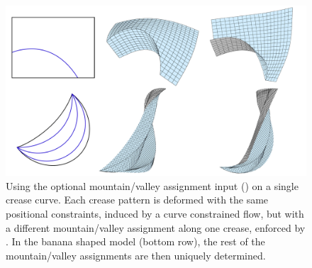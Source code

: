 \begin{figure} [h]
	\centering
	\includegraphics[width=\linewidth]{figures/MV_bias_modeling}
	\caption{Using the optional mountain/valley assignment input () on a single crease curve. Each crease pattern is deformed with the same positional constraints, induced by a curve constrained flow, but with a different mountain/valley assignment along one crease, enforced by . In the banana shaped model (bottom row), the rest of the mountain/valley assignments are then uniquely determined.}
	\label{fig:MV_bias_modeling}
\end{figure}
